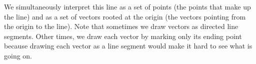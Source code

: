 \begin{center}
\end{center}
We simultaneously interpret this line as a set of points (the points that make up
the line) and as a set of vectors 
rooted at the origin (the vectors pointing from the origin to the line).
Note that sometimes we draw vectors as directed line segments.
Other times, we draw
each vector by marking only its ending point because drawing each vector as a line segment
would make
it hard to see what is going on.

